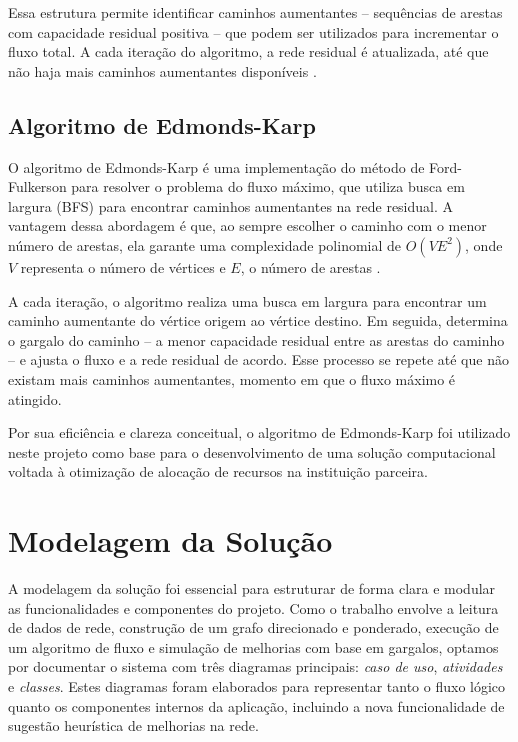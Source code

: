 \documentclass[12pt]{article}
\begin{document}
Essa estrutura permite identificar caminhos aumentantes – sequências de arestas com capacidade residual positiva – que podem ser utilizados para incrementar o fluxo total. A cada iteração do algoritmo, a rede residual é atualizada, até que não haja mais caminhos aumentantes disponíveis \cite{cormen2009}.

\subsection{Algoritmo de Edmonds-Karp}

O algoritmo de Edmonds-Karp é uma implementação do método de Ford-Fulkerson para resolver o problema do fluxo máximo, que utiliza busca em largura (BFS) para encontrar caminhos aumentantes na rede residual. A vantagem dessa abordagem é que, ao sempre escolher o caminho com o menor número de arestas, ela garante uma complexidade polinomial de \( O(VE^2) \), onde \( V \) representa o número de vértices e \( E \), o número de arestas \cite{edmonds1972}.

A cada iteração, o algoritmo realiza uma busca em largura para encontrar um caminho aumentante do vértice origem ao vértice destino. Em seguida, determina o gargalo do caminho – a menor capacidade residual entre as arestas do caminho – e ajusta o fluxo e a rede residual de acordo. Esse processo se repete até que não existam mais caminhos aumentantes, momento em que o fluxo máximo é atingido.

Por sua eficiência e clareza conceitual, o algoritmo de Edmonds-Karp foi utilizado neste projeto como base para o desenvolvimento de uma solução computacional voltada à otimização de alocação de recursos na instituição parceira.

\nocite{ahuja1993network,cormen2009,edmonds1972}



\section{Modelagem da Solução}

A modelagem da solução foi essencial para estruturar de forma clara e modular as funcionalidades e componentes do projeto. Como o trabalho envolve a leitura de dados de rede, construção de um grafo direcionado e ponderado, execução de um algoritmo de fluxo e simulação de melhorias com base em gargalos, optamos por documentar o sistema com três diagramas principais: \textit{caso de uso}, \textit{atividades} e \textit{classes}. Estes diagramas foram elaborados para representar tanto o fluxo lógico quanto os componentes internos da aplicação, incluindo a nova funcionalidade de sugestão heurística de melhorias na rede.
\end{document}
